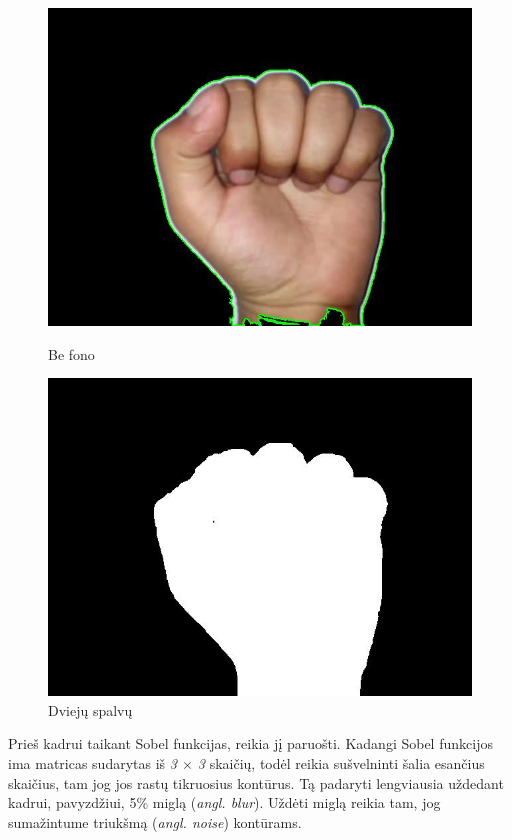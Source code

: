 \documentclass{VUMIFInfKursinis}
\begin{document}
\begin{figure}[H]
	\begin{minipage}{.3\textwidth}
		\centering
		\includegraphics[width=.8\linewidth]{img/A-black}
		\caption{Be fono}
		\label{img:a-black-sign}
	\end{minipage}\hspace{\fill}%
	\begin{minipage}{.3\textwidth}
		\centering
		\includegraphics[width=.8\linewidth]{img/A-white}
		\caption{Dviejų spalvų}
		\label{img:a-white-sign}
	\end{minipage}
\end{figure}

Prieš kadrui taikant Sobel funkcijas, reikia jį paruošti. Kadangi Sobel funkcijos ima matricas sudarytas iš \textit{3 $\times$ 3} skaičių, todėl reikia sušvelninti šalia esančius skaičius, tam jog jos rastų tikruosius kontūrus. Tą padaryti lengviausia uždedant kadrui, pavyzdžiui, 5\% miglą (\textit{angl. blur}). Uždėti miglą reikia tam, jog sumažintume triukšmą (\textit{angl. noise}) kontūrams. 
\end{document}
